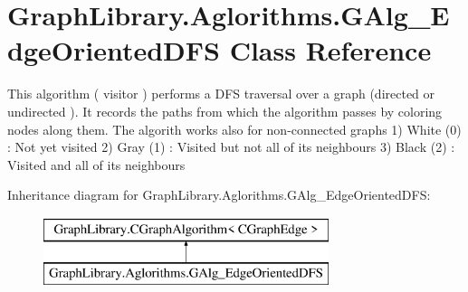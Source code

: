 \hypertarget{class_graph_library_1_1_aglorithms_1_1_g_alg___edge_oriented_d_f_s}{}\section{Graph\+Library.\+Aglorithms.\+G\+Alg\+\_\+\+Edge\+Oriented\+D\+F\+S Class Reference}
\label{class_graph_library_1_1_aglorithms_1_1_g_alg___edge_oriented_d_f_s}


This algorithm ( visitor ) performs a D\+F\+S traversal over a graph (directed or undirected ). It records the paths from which the algorithm passes by coloring nodes along them. The algorith works also for non-\/connected graphs 1) White (0) \+: Not yet visited 2) Gray (1) \+: Visited but not all of its neighbours 3) Black (2) \+: Visited and all of its neighbours  


Inheritance diagram for Graph\+Library.\+Aglorithms.\+G\+Alg\+\_\+\+Edge\+Oriented\+D\+F\+S\+:\begin{figure}[H]
\begin{center}
\leavevmode
\includegraphics[height=2.000000cm]{class_graph_library_1_1_aglorithms_1_1_g_alg___edge_oriented_d_f_s}
\end{center}
\end{figure}
